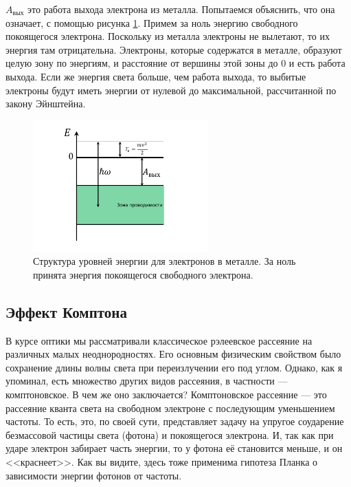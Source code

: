 \documentclass[12pt]{article}
\begin{document}
\noindent$A_{\text{вых}}$ это работа выхода электрона из металла. Попытаемся объяснить, что она означает, с помощью рисунка \ref{fig:sem_02_electron_energy}. Примем за ноль энергию свободного покоящегося электрона. Поскольку из металла электроны не вылетают, то их энергия там отрицательна. Электроны, которые содержатся в металле, образуют целую зону по энергиям, и расстояние от вершины этой зоны до 0 и есть работа выхода. Если же энергия света больше, чем работа выхода, то выбитые электроны будут иметь энергии от нулевой до максимальной, рассчитанной по закону Эйнштейна.
\begin{figure}[h]
    \centering
    \includegraphics[width=0.6\textwidth,keepaspectratio]{Seminar_02/pics/pic_02.pdf}
    \caption{Структура уровней энергии для электронов в металле. За ноль принята энергия покоящегося свободного электрона.}
    \label{fig:sem_02_electron_energy}
\end{figure}

\subsection{Эффект Комптона}
В курсе оптики мы рассматривали классическое рэлеевское рассеяние на различных малых неоднородностях. Его основным физическим свойством было сохранение длины волны света при переизлучении его под углом. Однако, как я упоминал, есть множество других видов рассеяния, в частности --- комптоновское. В чем же оно заключается? Комптоновское рассеяние --- это рассеяние кванта света на свободном электроне с последующим уменьшением частоты. То есть, это, по своей сути, представляет задачу на упругое соударение безмассовой частицы света (фотона) и покоящегося электрона. И, так как при ударе электрон забирает часть энергии, то у фотона её становится меньше, и он <<краснеет>>. Как вы видите, здесь тоже применима гипотеза Планка о зависимости энергии фотонов от частоты.
\end{document}
